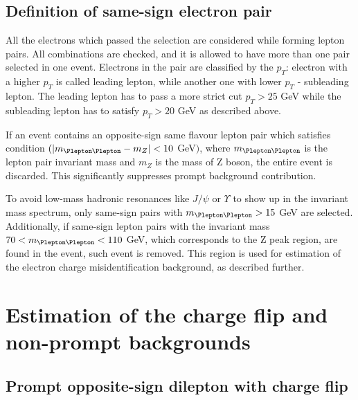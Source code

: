 \subsection{Definition of same-sign electron pair}
All the electrons which passed the selection are considered while forming lepton pairs.
All combinations are checked, and it is allowed to have more than one pair selected in one event.
Electrons in the pair are classified by the $p_T$: electron with a higher $p_T$ is called leading lepton, while another one with lower $p_T$ - subleading lepton.
The leading lepton has to pass a more strict cut $p_T>25$ GeV while the subleading lepton has to satisfy $p_T>20$ GeV as described above.

If an event contains an opposite-sign same flavour lepton pair which satisfies condition $( |m_{\Plepton\Plepton} - m_{Z}| < 10$ GeV$)$,
where $m_{\Plepton\Plepton}$ is the lepton pair invariant mass and $m_{Z}$ is the mass of Z boson, the entire event is discarded.
This significantly suppresses prompt background contribution.

To avoid low-mass hadronic resonances like $J/\psi$ or $\varUpsilon$ to show up in the invariant mass spectrum, 
only same-sign pairs with $m_{\Plepton\Plepton}>15$ GeV are selected.
Additionally, if same-sign lepton pairs with the invariant mass $70 < m_{\Plepton\Plepton}< 110$ GeV, 
which corresponds to the Z peak region, are found in the event, such event is removed.
This region is used for estimation of the electron charge misidentification background, as described further.

\section{Estimation of the charge flip and non-prompt backgrounds}

\subsection{Prompt opposite-sign dilepton with charge flip}
\label{subsec:CF_definition}


